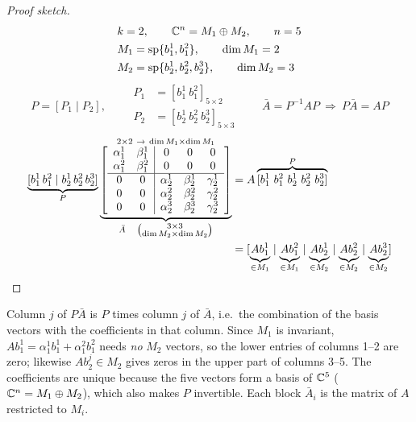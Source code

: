 \begin{proof}[Proof sketch]
\begin{align*}
&k=2,\qquad \mathbb{C}^n=M_1\oplus M_2,\qquad n=5\\
&M_1=\operatorname{sp}\{b_1^1,b_1^2\},\qquad\dim M_1=2\\
&M_2=\operatorname{sp}\{b_2^1,b_2^2,b_2^3\},\qquad\dim M_2=3
\end{align*}
\[
P=[P_1\mid P_2],\qquad
\begin{aligned}
P_1&=[b_1^1\ b_1^2]_{5\times2}\\
P_2&=[b_2^1\ b_2^2\ b_2^3]_{5\times3}
\end{aligned}
\qquad
\bar{A}=P^{-1}AP\ \Rightarrow\ P\bar{A}=AP
\]
\begin{align*}
\underbrace{[b_1^1\,b_1^2\mid b_2^1\,b_2^2\,b_2^3]}_{P}
\underbrace{\overset{2\times2\ \to\ \dim M_1\times\dim M_1}{\left[\begin{array}{cc|ccc}
\alpha_1^1&\beta_1^1&0&0&0\\
\alpha_1^2&\beta_1^2&0&0&0\\\hline
0&0&\alpha_2^1&\beta_2^1&\gamma_2^1\\
0&0&\alpha_2^2&\beta_2^2&\gamma_2^2\\
0&0&\alpha_2^3&\beta_2^3&\gamma_2^3
\end{array}\right]}}_{\bar{A}\quad\left(\substack{3\times3\\ \dim M_2\times\dim M_2}\right)}
&=A\overbrace{[b_1^1\ b_1^2\ b_2^1\ b_2^2\ b_2^3]}^{P}\\
&=[\underbrace{Ab_1^1}_{\in M_1}\mid\underbrace{Ab_1^2}_{\in M_1}\mid\underbrace{Ab_2^1}_{\in M_2}\mid\underbrace{Ab_2^2}_{\in M_2}\mid\underbrace{Ab_2^3}_{\in M_2}]\qedhere
\end{align*}
\end{proof}
\begin{insight}
Column $j$ of $P\bar A$ is $P$ times column $j$ of $\bar A$, i.e.\ the combination of the basis vectors with the coefficients in that column. Since $M_1$ is invariant, $Ab_1^1=\alpha_1^1b_1^1+\alpha_1^2b_1^2$ needs \emph{no} $M_2$ vectors, so the lower entries of columns 1--2 are zero; likewise $Ab_2^j\in M_2$ gives zeros in the upper part of columns 3--5. The coefficients are unique because the five vectors form a basis of $\mathbb{C}^5$ ($\mathbb{C}^n=M_1\oplus M_2$), which also makes $P$ invertible. Each block $\bar A_i$ is the matrix of $A$ restricted to $M_i$.
\end{insight}

